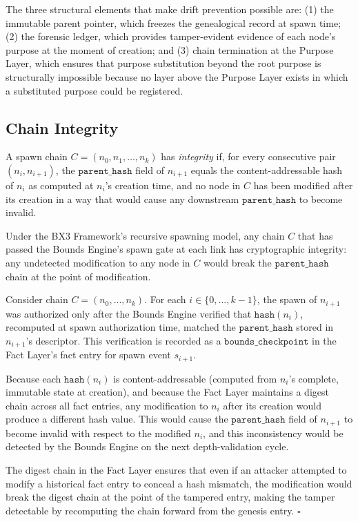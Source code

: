 The three structural elements that make drift prevention possible are: (1) the immutable parent pointer, which freezes the genealogical record at spawn time; (2) the forensic ledger, which provides tamper-evident evidence of each node's purpose at the moment of creation; and (3) chain termination at the Purpose Layer, which ensures that purpose substitution beyond the root purpose is structurally impossible because no layer above the Purpose Layer exists in which a substituted purpose could be registered.

\subsection{Chain Integrity}
\label{sec:chain-integrity}

\begin{definition}
A spawn chain $C = (n_0, n_1, \ldots, n_k)$ has \emph{integrity} if, for every consecutive pair $(n_i, n_{i+1})$, the $\texttt{parent\_hash}$ field of $n_{i+1}$ equals the content-addressable hash of $n_i$ as computed at $n_i$'s creation time, and no node in $C$ has been modified after its creation in a way that would cause any downstream $\texttt{parent\_hash}$ to become invalid.
\end{definition}

\begin{maintheorem}
Under the BX3 Framework's recursive spawning model, any chain $C$ that has passed the Bounds Engine's spawn gate at each link has cryptographic integrity: any undetected modification to any node in $C$ would break the $\texttt{parent\_hash}$ chain at the point of modification.
\end{maintheorem}

\begin{ProofSketch}
Consider chain $C = (n_0, \ldots, n_k)$. For each $i \in \{0, \ldots, k-1\}$, the spawn of $n_{i+1}$ was authorized only after the Bounds Engine verified that $\texttt{hash}(n_i)$, recomputed at spawn authorization time, matched the $\texttt{parent\_hash}$ stored in $n_{i+1}$'s descriptor. This verification is recorded as a $\texttt{bounds\_checkpoint}$ in the Fact Layer's fact entry for spawn event $s_{i+1}$.

Because each $\texttt{hash}(n_i)$ is content-addressable (computed from $n_i$'s complete, immutable state at creation), and because the Fact Layer maintains a digest chain across all fact entries, any modification to $n_i$ after its creation would produce a different hash value. This would cause the $\texttt{parent\_hash}$ field of $n_{i+1}$ to become invalid with respect to the modified $n_i$, and this inconsistency would be detected by the Bounds Engine on the next depth-validation cycle.

The digest chain in the Fact Layer ensures that even if an attacker attempted to modify a historical fact entry to conceal a hash mismatch, the modification would break the digest chain at the point of the tampered entry, making the tamper detectable by recomputing the chain forward from the genesis entry. $\square$
\end{ProofSketch}

